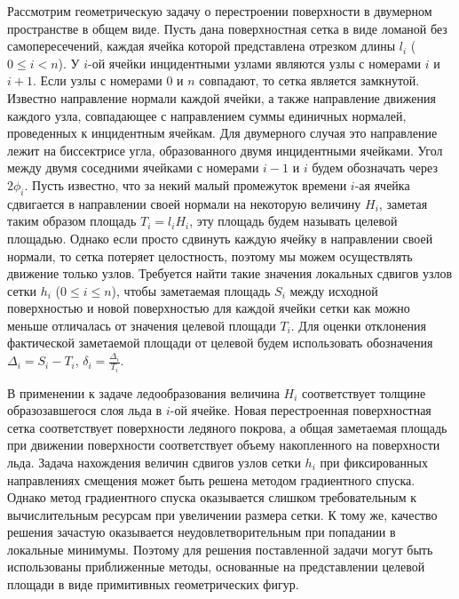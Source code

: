 \documentclass[
11pt,%
tightenlines,%
twoside,%
onecolumn,%
nofloats,%
nobibnotes,%
nofootinbib,%
superscriptaddress,%
noshowpacs,%
centertags]%
{revtex4}
\begin{document}
Рассмотрим геометрическую задачу о перестроении поверхности в двумерном пространстве в общем виде.
Пусть дана поверхностная сетка в виде ломаной без самопересечений, каждая ячейка которой представлена отрезком длины $l_i$ ($0 \le i < n$).
У $i$-ой ячейки инцидентными узлами являются узлы с номерами $i$ и $i + 1$.
Если узлы с номерами $0$ и $n$ совпадают, то сетка является замкнутой.
Известно направление нормали каждой ячейки, а также направление движения каждого узла, совпадающее с направлением суммы единичных нормалей, проведенных к инцидентным ячейкам.
Для двумерного случая это направление лежит на биссектрисе угла, образованного двумя инцидентными ячейками.
Угол между двумя соседними ячейками с номерами $i - 1$ и $i$ будем обозначать через $2 \phi_i$.
Пусть известно, что за некий малый промежуток времени $i$-ая ячейка сдвигается в направлении своей нормали на некоторую величину $H_i$, заметая таким образом площадь $T_i = l_i H_i$, эту площадь будем называть целевой площадью.
Однако если просто сдвинуть каждую ячейку в направлении своей нормали, то сетка потеряет целостность, поэтому мы можем осуществлять движение только узлов.
Требуется найти такие значения локальных сдвигов узлов сетки $h_i$ ($0 \le i \le n$), чтобы заметаемая площадь $S_i$ между исходной поверхностью и новой поверхностью для каждой ячейки сетки как можно меньше отличалась от значения целевой площади $T_i$.
Для оценки отклонения фактической заметаемой площади от целевой будем использовать обозначения $\Delta_i = S_i - T_i$, $\delta_i = \frac{\Delta_i}{T_i}$.

В применении к задаче ледообразования величина $H_i$ соответствует толщине образозавшегося слоя льда в $i$-ой ячейке.
Новая перестроенная поверхностная сетка соответствует поверхности ледяного покрова, а общая заметаемая площадь при движении поверхности соответствует объему накопленного на поверхности льда.
Задача нахождения величин сдвигов узлов сетки $h_i$ при фиксированных направлениях смещения может быть решена методом градиентного спуска.
Однако метод градиентного спуска оказывается слишком требовательным к вычислительным ресурсам при увеличении размера сетки.
К тому же, качество решения зачастую оказывается неудовлетворительным при попадании в локальные минимумы.
Поэтому для решения поставленной задачи могут быть использованы приближенные методы, основанные на представлении целевой площади в виде примитивных геометрических фигур.

\end{document}
